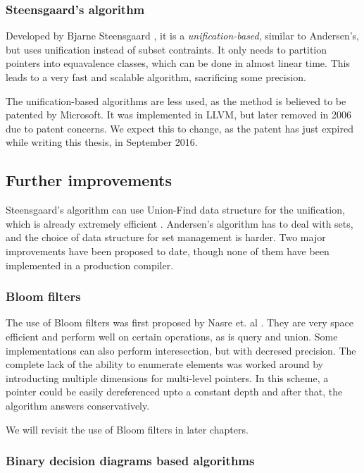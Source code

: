\subsubsection{Steensgaard's algorithm}

Developed by Bjarne Steensgaard \cite{Steensgaard96}, it is  a {\it
unification-based}, similar to Andersen's, but uses unification instead of
subset contraints. It only needs to partition pointers into equavalence
classes, which can be done in almost linear time. This leads to a very fast and
scalable algorithm, sacrificing some precision.

The unification-based algorithms are less used, as the method is
believed to be patented by Microsoft\cite{patent:steensgaard}. It was
implemented in LLVM, but later removed in 2006 \cite{LLVM:DSA:Remove} due to
patent concerns. We expect this to change, as the patent has just expired while
writing this thesis, in September 2016.

\subsection{Further improvements}

Steensgaard's algorithm can use Union-Find data structure for the unification,
which is already extremely efficient \cite{Tarjan1975}. Andersen's algorithm has
to deal with sets, and the choice of data structure for set management is
harder. Two major improvements have been proposed to date, though none of them
have been implemented in a production compiler.

\subsubsection{Bloom filters}

The use of Bloom filters was first proposed by Nasre et. al \cite{nasre2009}.
They are very space efficient and perform well on certain operations, as is
query and union. Some implementations can also perform interesection, but with
decresed precision. The complete lack of the ability to enumerate elements was
worked around by introducting multiple dimensions for multi-level pointers. In
this scheme, a pointer could be easily dereferenced upto a constant depth and
after that, the algorithm answers conservatively.

We will revisit the use of Bloom filters in later chapters.

\subsubsection{Binary decision diagrams based algorithms}

